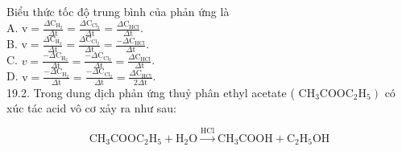 \documentclass[10pt]{article}
\begin{document}
Biểu thức tốc độ trung bình của phản ứng là\\
A. $\mathrm{v}=\frac{\Delta \mathrm{C}_{\mathrm{H}_{2}}}{\Delta \mathrm{t}}=\frac{\Delta \mathrm{C}_{\mathrm{Cl}_{2}}}{\Delta \mathrm{t}}=\frac{\Delta \mathrm{C}_{\mathrm{HCl}}}{\Delta \mathrm{t}}$.\\
B. $\mathrm{v}=\frac{\Delta \mathrm{C}_{\mathrm{H}_{2}}}{\Delta \mathrm{t}}=\frac{\Delta \mathrm{C}_{\mathrm{Cl}_{2}}}{\Delta \mathrm{t}}=\frac{-\Delta \mathrm{C}_{\mathrm{HCl}}}{\Delta \mathrm{t}}$.\\
C. $v=\frac{-\Delta \mathrm{C}_{\mathrm{H}_{2}}}{\Delta \mathrm{t}}=\frac{-\Delta \mathrm{C}_{\mathrm{Cl}_{2}}}{\Delta \mathrm{t}}=\frac{\Delta \mathrm{C}_{\mathrm{HCl}}}{\Delta \mathrm{t}}$.\\
D. $\mathrm{v}=\frac{-\Delta \mathrm{C}_{\mathrm{H}_{2}}}{\Delta \mathrm{t}}=\frac{-\Delta \mathrm{C}_{\mathrm{Cl}_{2}}}{\Delta \mathrm{t}}=\frac{\Delta \mathrm{C}_{\mathrm{HCl}}}{2 \Delta \mathrm{t}}$.\\
19.2. Trong dung dịch phản ứng thuỷ phân ethyl acetate ( $\left.\mathrm{CH}_{3} \mathrm{COOC}_{2} \mathrm{H}_{5}\right)$ có xúc tác acid vô cơ xảy ra như sau:

$$
\mathrm{CH}_{3} \mathrm{COOC}_{2} \mathrm{H}_{5}+\mathrm{H}_{2} \mathrm{O} \xrightarrow{\mathrm{HCl}} \mathrm{CH}_{3} \mathrm{COOH}+\mathrm{C}_{2} \mathrm{H}_{5} \mathrm{OH}
$$
\end{document}
